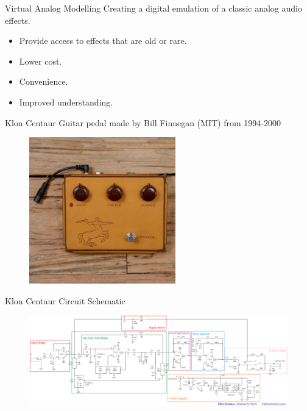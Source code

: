 \begin{frame}{Virtual Analog Modelling}
    Creating a digital emulation of a classic analog audio effects.
    \vspace{1ex}
    \begin{itemize}
        \itemsep0em
        \item Provide access to effects that are old or rare.
        \item Lower cost.
        \item Convenience.
        \item Improved understanding.
    \end{itemize}
\end{frame}

\begin{frame}{Klon Centaur}
    Guitar pedal made by Bill Finnegan (MIT) from 1994-2000
    \vspace{1ex}
    \begin{figure}
        \centering
        \includegraphics[height=2.5in]{../Paper/Figures/KlonCentaur.jpg}
    \end{figure}
\end{frame}

\begin{frame}{Klon Centaur Circuit Schematic}
    \begin{figure}
        \centering
        \includegraphics[width=5.5in]{../Paper/Figures/FullCircuit.png}
    \end{figure}
\end{frame}

